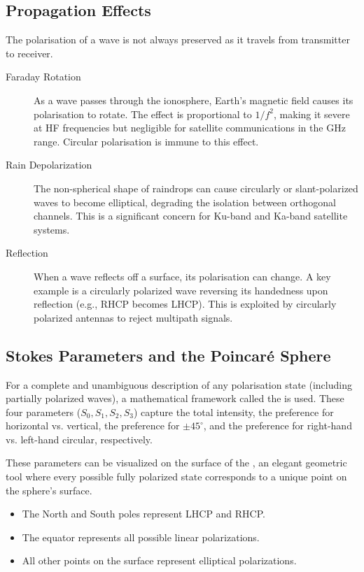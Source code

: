 \subsection{Propagation Effects}

The polarisation of a wave is not always preserved as it travels from transmitter to receiver.
\begin{description}
    \item[Faraday Rotation] As a wave passes through the ionosphere, Earth's magnetic field causes its polarisation to rotate. The effect is proportional to $1/f^2$, making it severe at HF frequencies but negligible for satellite communications in the GHz range. Circular polarisation is immune to this effect.
    \item[Rain Depolarization] The non-spherical shape of raindrops can cause circularly or slant-polarized waves to become elliptical, degrading the isolation between orthogonal channels. This is a significant concern for Ku-band and Ka-band satellite systems.
    \item[Reflection] When a wave reflects off a surface, its polarisation can change. A key example is a circularly polarized wave reversing its handedness upon reflection (e.g., RHCP becomes LHCP). This is exploited by circularly polarized antennas to reject multipath signals.
\end{description}


\subsection{Stokes Parameters and the Poincaré Sphere}

For a complete and unambiguous description of any polarisation state (including partially polarized waves), a mathematical framework called the  is used. These four parameters ($S_0, S_1, S_2, S_3$) capture the total intensity, the preference for horizontal vs. vertical, the preference for $\pm45^\circ$, and the preference for right-hand vs. left-hand circular, respectively.

These parameters can be visualized on the surface of the , an elegant geometric tool where every possible fully polarized state corresponds to a unique point on the sphere's surface.
\begin{itemize}
    \item The North and South poles represent LHCP and RHCP.
    \item The equator represents all possible linear polarizations.
    \item All other points on the surface represent elliptical polarizations.
\end{itemize}

